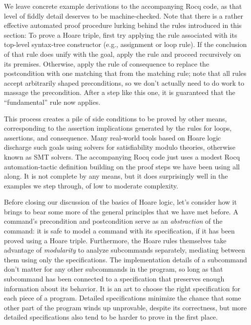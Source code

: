 \documentclass{amsbook}
\theoremstyle{definition}
\theoremstyle{remark}
\numberwithin{section}{chapter}
\numberwithin{equation}{chapter}
\begin{document}
We leave concrete example derivations to the accompanying Rocq code, as that level of fiddly detail deserves to be machine-checked.
Note that there is a rather effective automated proof procedure lurking behind the rules introduced in this section:
To prove a Hoare triple, first try applying the rule associated with its top-level syntax-tree constructor (e.g., assignment or loop rule).
If the conclusion of that rule does unify with the goal, apply the rule and proceed recursively on its premises.
Otherwise, apply the rule of consequence to replace the postcondition with one matching that from the matching rule; note that all rules accept arbitrarily shaped preconditions, so we don't actually need to do work to massage the precondition.
After a step like this one, it is guaranteed that the ``fundamental'' rule now applies.

This process creates a pile of side conditions to be proved by other means, corresponding to the assertion implications generated by the rules for loops, assertions, and consequence.
Many real-world tools based on Hoare logic discharge such goals using solvers for satisfiability modulo theories, otherwise known as SMT solvers.
The accompanying Rocq code just uses a modest Rocq automation-tactic definition building on the proof steps we have been using all along.
It is not complete by any means, but it does surprisingly well in the examples we step through, of low to moderate complexity.

Before closing our discussion of the basics of Hoare logic, let's consider how it brings to bear some more of the general principles that we have met before.
\abstraction
A command's precondition and postcondition serve as an \emph{abstraction} of the command: it is safe to model a command with its specification, if it has been proved using a Hoare triple.
\modularity
Furthermore, the Hoare rules themselves take advantage of \emph{modularity} to analyze subcommands separately, mediating between them using only the specifications.
The implementation details of a subcommand don't matter for any other subcommands in the program, so long as that subcommand has been connected to a specification that preserves enough information about its behavior.
It is an art to choose the right specification for each piece of a program.
Detailed specifications minimize the chance that some other part of the program winds up unprovable, despite its correctness, but more detailed specifications also tend to be harder to prove in the first place.
\end{document}
